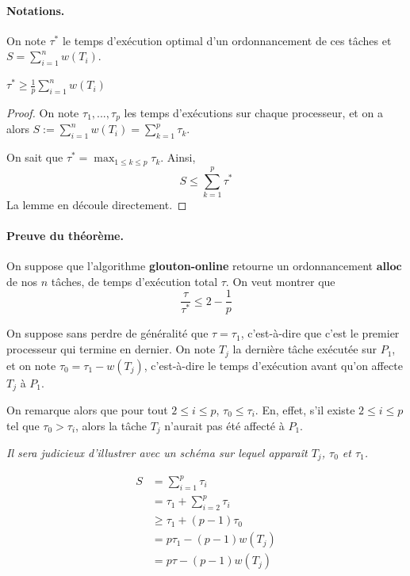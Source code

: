 \paragraph{Notations.} On note $\tau^*$ le temps d'exécution optimal d'un ordonnancement de ces tâches et $S=\sum_{i=1}^n w(T_i)$. 

\begin{lemma}
$\tau^* \geq \frac{1}{p}\sum_{i=1}^n w(T_i)$
\end{lemma}

\begin{proof}
On note $\tau_1,...,\tau_p$ les temps d'exécutions sur chaque processeur, et on a alors $ S := \sum_{i=1}^n w(T_i) = \sum_{k=1}^p \tau_k$.

On sait que $\tau^* = \max_{1\leq k\leq p} \tau_k$. Ainsi, 
$$
S \leq \sum_{k=1}^p \tau^*
$$
La lemme en découle directement.
\end{proof}

\paragraph{Preuve du théorème.} On suppose que l'algorithme \textbf{glouton-online} retourne un ordonnancement $\mathbf{alloc}$ de nos $n$ tâches, de temps d'exécution total $\tau$. On veut montrer que 
$$
\frac{\tau}{\tau^*}\leq 2-\frac{1}{p}
$$

On suppose sans perdre de généralité que $\tau=\tau_1$, c'est-à-dire que c'est le premier processeur qui termine en dernier. On note $T_j$ la dernière tâche exécutée sur $P_1$, et on note $\tau_0=\tau_1 -w(T_j)$, c'est-à-dire le temps d'exécution avant qu'on affecte $T_j$ à $P_1$. 

On remarque alors que pour tout $2\leq i \leq p$, $\tau_0 \leq \tau_i$. En, effet, s'il existe $2\leq i \leq p$ tel que $\tau_0 >\tau_i$, alors la tâche $T_j$ n'aurait pas été affecté à $P_1$.\newline 

\begin{center}
\textit{Il sera judicieux d'illustrer avec un schéma sur lequel apparaît $T_j$, $\tau_0$ et $\tau_1$.}
\end{center}

\begin{align*}
S &= \sum_{i=1}^p \tau_i \\
&= \tau_1 + \sum_{i=2}^p \tau_i \\
&\geq \tau_1 + (p-1)\tau_0 \\ 
&= p \tau_1 - (p-1) w(T_j) \\
&= p\tau -(p-1)w(T_j)
\end{align*} 

